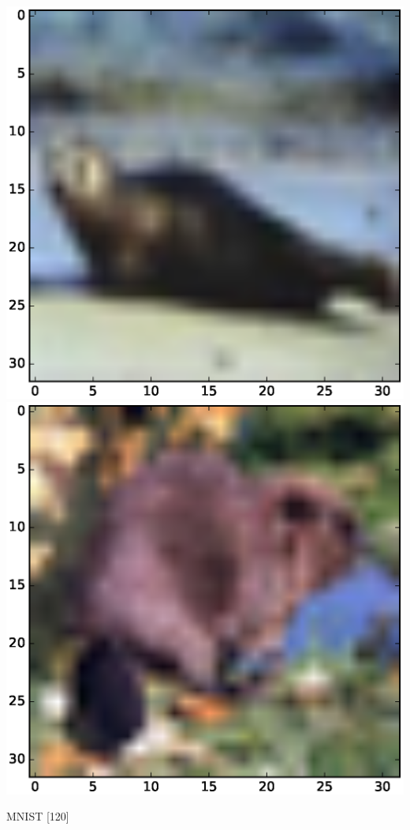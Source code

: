 \documentclass{article}
\begin{document}
\includegraphics[scale=.1]{fig/c8.eps}
\includegraphics[scale=.1]{fig/c10.eps}



MNIST
[120]
\end{document}
